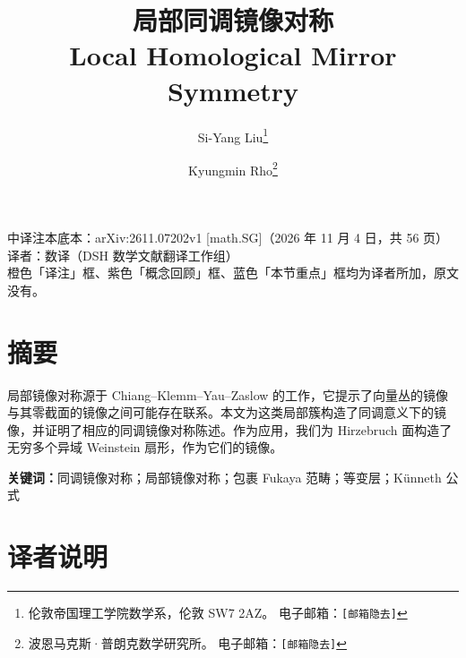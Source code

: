 \title{\bfseries 局部同调镜像对称\\[6pt]
       \large Local Homological Mirror Symmetry}
\author{Si-Yang Liu\thanks{伦敦帝国理工学院数学系，伦敦 SW7 2AZ。
        电子邮箱：\texttt{[邮箱隐去]}}
        \and Kyungmin Rho\thanks{波恩马克斯·普朗克数学研究所。
        电子邮箱：\texttt{[邮箱隐去]}}}
\date{}

\maketitle

\begin{center}
\small
中译注本\quad 底本：arXiv:2611.07202v1 [math.SG]（2026 年 11 月 4 日，共 56 页）\\[2pt]
译者：数译（DSH 数学文献翻译工作组）\\
橙色「译注」框、紫色「概念回顾」框、蓝色「本节重点」框均为译者所加，原文没有。
\end{center}

\vspace{0.8em}

\section*{摘要}
局部镜像对称源于 Chiang--Klemm--Yau--Zaslow 的工作，它提示了向量丛的镜像与其零截面的镜像之间可能存在联系。本文为这类局部簇构造了同调意义下的镜像，并证明了相应的同调镜像对称陈述。作为应用，我们为 Hirzebruch 面构造了无穷多个异域 Weinstein 扇形，作为它们的镜像。

\vspace{0.6em}
\noindent\textbf{关键词：}同调镜像对称；局部镜像对称；包裹 Fukaya 范畴；等变层；Künneth 公式

\clearpage

\section*{译者说明}

